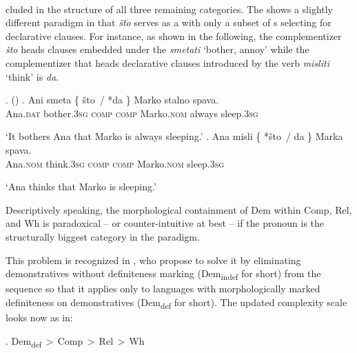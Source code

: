 \noindent 
{}\\
cluded in the structure of all three remaining categories. The  shows a slightly different paradigm in that \textit{\v{s}to} serves as a  with only a subset of s selecting for declarative clauses. For instance, as shown in the following, the complementizer \textit{\v{s}to} heads clauses embedded under the  \textit{smetati} `bother, annoy' while the complementizer that heads declarative clauses introduced by the verb \textit{misliti} `think' is \textit{da}.

\ex.  (\citealt[114]{Mihalicek})
\ag. Ani smeta \{ {\v{s}to \,/} {*da \}} Marko stalno spava.\\
Ana.\textsc{dat} bother.\textsc{3sg} {} {\textsc{comp}} {\textsc{\phantom{l}comp}}  Marko.\textsc{nom} always sleep.\textsc{3sg}\\
\strut `It bothers Ana that Marko is always sleeping.' 
\bg. Ana misli \{ {*\v{s}to \,/} {da \}} Marka spava.\\
Ana.\textsc{nom} think.\textsc{3sg} {} {\phantom{l}\textsc{comp}} {\textsc{comp}}  Marko.\textsc{nom} sleep.\textsc{3sg}\\
\strut `Ana thinks that Marko is sleeping.'

\noindent Descriptively speaking, the morphological containment of Dem within Comp, Rel, and Wh is paradoxical -- or counter-intuitive at best -- if the  pronoun is the structurally biggest category in the paradigm.
\par
This problem is recognized in \cite{BaunazLander2018}, who propose to solve it by eliminating demonstratives without definiteness marking (Dem\textsubscript{indef} for short) from the sequence so that it applies only to languages with morphologically marked definiteness on demonstratives (Dem\textsubscript{def} for short). The updated complexity scale looks now as in:

\ex.\label{dem-def} Dem\textsubscript{def}\,$>$\,Comp\,$>$\,Rel\,$>$\,Wh

